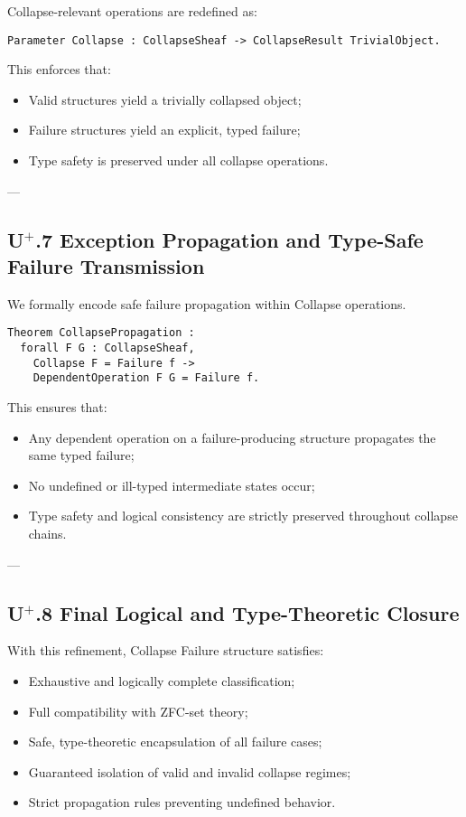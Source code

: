 \documentclass[11pt]{article}
\begin{document}
Collapse-relevant operations are redefined as:

\begin{lstlisting}[language=Coq]
Parameter Collapse : CollapseSheaf -> CollapseResult TrivialObject.
\end{lstlisting}

This enforces that:

\begin{itemize}
    \item Valid structures yield a trivially collapsed object;
    \item Failure structures yield an explicit, typed failure;
    \item Type safety is preserved under all collapse operations.
\end{itemize}

---

\subsection*{U$^{+}$.7 Exception Propagation and Type-Safe Failure Transmission}

We formally encode safe failure propagation within Collapse operations.

\begin{lstlisting}[language=Coq]
Theorem CollapsePropagation :
  forall F G : CollapseSheaf,
    Collapse F = Failure f ->
    DependentOperation F G = Failure f.
\end{lstlisting}

This ensures that:

\begin{itemize}
    \item Any dependent operation on a failure-producing structure propagates the same typed failure;
    \item No undefined or ill-typed intermediate states occur;
    \item Type safety and logical consistency are strictly preserved throughout collapse chains.
\end{itemize}

---

\subsection*{U$^{+}$.8 Final Logical and Type-Theoretic Closure}

With this refinement, Collapse Failure structure satisfies:

\begin{itemize}
    \item Exhaustive and logically complete classification;
    \item Full compatibility with ZFC-set theory;
    \item Safe, type-theoretic encapsulation of all failure cases;
    \item Guaranteed isolation of valid and invalid collapse regimes;
    \item Strict propagation rules preventing undefined behavior.
\end{itemize}
\end{document}
